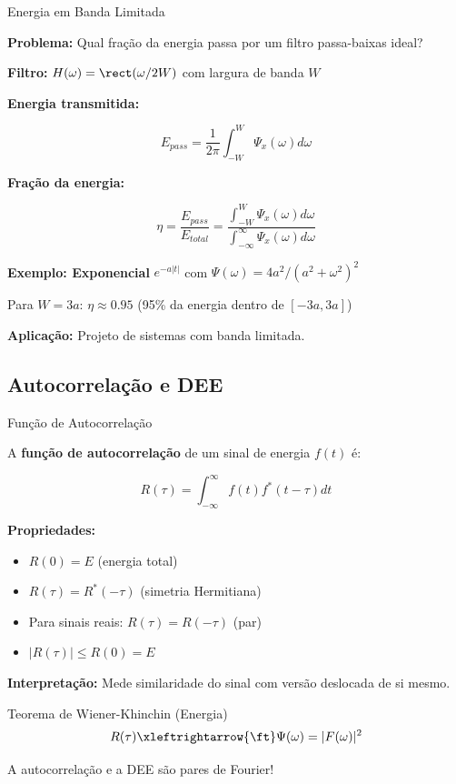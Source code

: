 
\begin{frame}{Energia em Banda Limitada}

\textbf{Problema:} Qual fração da energia passa por um filtro passa-baixas ideal?

\textbf{Filtro:} $H(\omega) = \rect(\omega/2W)$ com largura de banda $W$

\textbf{Energia transmitida:}

\[
E_{pass} = \frac{1}{2\pi} \int_{-W}^{W} \Psi_x(\omega) d\omega
\]

\textbf{Fração da energia:}

\[
\eta = \frac{E_{pass}}{E_{total}} = \frac{\int_{-W}^{W} \Psi_x(\omega) d\omega}{\int_{-\infty}^{\infty} \Psi_x(\omega) d\omega}
\]

\vspace{0.1cm}

\textbf{Exemplo: Exponencial} $e^{-a|t|}$ com $\Psi(\omega) = 4a^2/(a^2+\omega^2)^2$

Para $W = 3a$: $\eta \approx 0.95$ (95\% da energia dentro de $[-3a, 3a]$)

\textbf{Aplicação:} Projeto de sistemas com banda limitada.

\end{frame}


\subsection{Autocorrelação e DEE}

\begin{frame}{Função de Autocorrelação}

A \textbf{função de autocorrelação} de um sinal de energia $f(t)$ é:

\[
R(\tau) = \int_{-\infty}^{\infty} f(t) f^*(t - \tau) dt
\]

\textbf{Propriedades:}

\begin{itemize}
\item $R(0) = E$ (energia total)
\item $R(\tau) = R^*(-\tau)$ (simetria Hermitiana)
\item Para sinais reais: $R(\tau) = R(-\tau)$ (par)
\item $|R(\tau)| \leq R(0) = E$
\end{itemize}

\vspace{0.1cm}

\textbf{Interpretação:} Mede similaridade do sinal com versão deslocada de si mesmo.

\begin{block}{Teorema de Wiener-Khinchin (Energia)}
\[
R(\tau) \xleftrightarrow{\ft} \Psi(\omega) = |F(\omega)|^2
\]
\end{block}

A autocorrelação e a DEE são pares de Fourier!

\end{frame}

